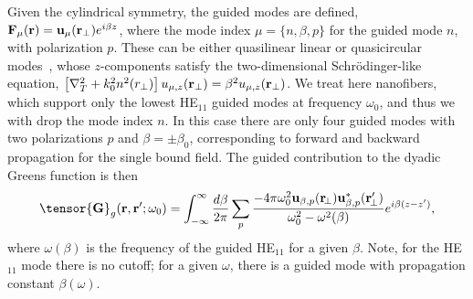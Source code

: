 \documentclass[preprint,aps,pra,onecolumn]{revtex4-1} %
\begin{document}
Given the cylindrical symmetry, the guided modes are defined, $\mathbf{F}_\mu (\mathbf{r}) = \mathbf{u}_\mu (\mathbf{r}_\perp) e^{i\beta z}$, where the mode index $\mu=\{n, \beta, p\}$ for the guided mode $n$, with polarization $p$.  These can be either quasilinear linear or quasicircular modes~\cite{?}, whose $z$-components satisfy the two-dimensional Schr\"{o}dinger-like equation, $\left[\nabla_T^2 +k_0^2 n^2(r_\perp) \right] u_{\mu,z} (\mathbf{r}_\perp) = \beta^2 u_{\mu,z} (\mathbf{r}_\perp)$.  We treat here nanofibers, which support only the lowest HE$_{11}$ guided modes at frequency $\omega_0$, and thus we with drop the mode index $n$.  In this case there are only four guided modes with two polarizations $p$ and $\beta = \pm \beta_0$, corresponding to forward and backward propagation for the single bound field.  The guided contribution to the dyadic Greens function is then 
\begin{equation}
\tensor{\mathbf{G}}_g(\br,\br'; \omega_0) = \int_{-\infty}^\infty \frac{d \beta}{2 \pi} \sum_{p} \frac{-4\pi\omega_0^2\mathbf{u}_{\beta,p} (\br\!_\perp)\mathbf{u}^*_{\beta,p} (\br_{\!\perp}^\prime)}{\omega_0^2-\omega^2(\beta)}e^{i\beta(z-z')},\label{eq:Gganaly}
\end{equation}
where $ \omega(\beta)$ is the frequency of the guided HE$_{11}$ for a given $\beta$.  Note, for the HE$_{11}$ mode there is no cutoff; for a given $\omega$, there is a guided mode with propagation constant $\beta(\omega)$.  
\end{document}
